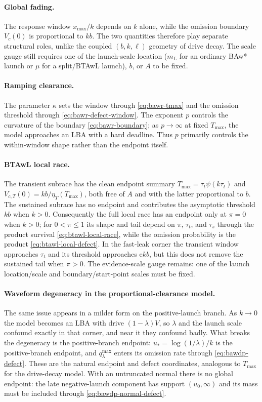 \documentclass[12pt]{article}
\newcommand{\e}{\mathrm{e}}
\theoremstyle{remark}
\begin{document}
\paragraph{Global fading.} The response window $x_{\max}/k$ depends on $k$
alone, while the omission boundary $V_c(0)$ is proportional to $kb$. The two quantities therefore play separate structural roles, unlike the coupled $(b,k,\ell)$ geometry of drive decay. The scale gauge still requires one of the launch-scale location ($m_L$ for an ordinary BAw* launch or $\mu$ for a split/BTAwL launch), $b$, or $A$ to be fixed.

\paragraph{Ramping clearance.} The parameter $\kappa$ sets the window through
\eqref{eq:bawr-tmax} and the omission threshold through
\eqref{eq:bawr-defect-window}. The exponent $p$ controls the curvature of the
boundary \eqref{eq:bawr-boundary}; as $p\to\infty$ at fixed $T_{\max}$, the model approaches an LBA with a hard deadline. Thus $p$ primarily controls the within-window shape rather than the endpoint itself.

\paragraph{BTAwL local race.} The transient subrace has the clean endpoint
summary $T_{\max}=\tau_t\psi(k\tau_t)$ and $V_{c,T}(0)=kb/\eta_T(T_{\max})$, both free of $A$ and with the latter proportional to $b$.  The sustained subrace has no endpoint and contributes the asymptotic threshold $kb$ when $k>0$.  Consequently the full local race has an endpoint only at $\pi=0$ when $k>0$; for $0<\pi\le1$ its shape and tail depend on $\pi$, $\tau_t$, and $\tau_s$ through the product survival
\eqref{eq:btawl-local-race}, while the omission probability is the product
\eqref{eq:btawl-local-defect}.  In the fast-leak corner the transient window
approaches $\tau_t$ and its threshold approaches $\e kb$, but this does not remove the sustained tail when $\pi>0$.  The evidence-scale gauge remains: one of the launch location/scale and boundary/start-point scales must be fixed.

\paragraph{Waveform degeneracy in the proportional-clearance model.} The same
issue appears in a milder form on the positive-launch branch. As $k \to 0$ the model becomes an LBA with drive $(1-\lambda)V$, so $\lambda$ and the launch scale confound exactly in that corner, and near it they confound badly. What breaks the degeneracy is the positive-branch endpoint: $u_{*} = \log(1/\lambda)/k$ is the positive-branch endpoint, and $q_{\lambda}^{\max}$ enters its omission rate through
\eqref{eq:bawdp-defect}. These are the natural endpoint and defect
coordinates, analogous to $T_{\max}$ for the drive-decay model. With an untruncated normal there is no global endpoint: the late negative-launch component has support $(u_0,\infty)$ and its mass must be included through \eqref{eq:bawdp-normal-defect}.
\end{document}
